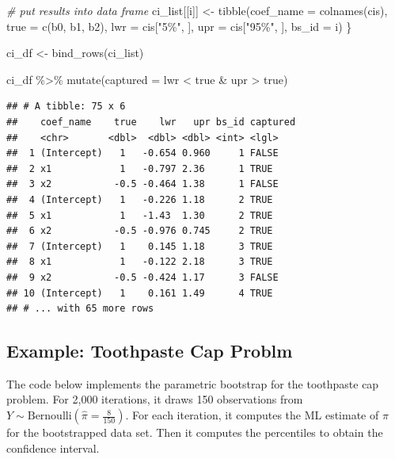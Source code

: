 \documentclass[
]{book}
\newenvironment{Shaded}{\begin{snugshade}}{\end{snugshade}}
\newcommand{\AttributeTok}[1]{\textcolor[rgb]{0.77,0.63,0.00}{#1}}
\newcommand{\CommentTok}[1]{\textcolor[rgb]{0.56,0.35,0.01}{\textit{#1}}}
\newcommand{\FunctionTok}[1]{\textcolor[rgb]{0.00,0.00,0.00}{#1}}
\newcommand{\NormalTok}[1]{#1}
\newcommand{\OtherTok}[1]{\textcolor[rgb]{0.56,0.35,0.01}{#1}}
\newcommand{\SpecialCharTok}[1]{\textcolor[rgb]{0.00,0.00,0.00}{#1}}
\newcommand{\StringTok}[1]{\textcolor[rgb]{0.31,0.60,0.02}{#1}}
\begin{document}
\begin{Shaded}
\begin{Highlighting}[]
  \CommentTok{\# put results into data frame}
\NormalTok{  ci\_list[[i]] }\OtherTok{\textless{}{-}} \FunctionTok{tibble}\NormalTok{(}\AttributeTok{coef\_name =} \FunctionTok{colnames}\NormalTok{(cis),}
                         \AttributeTok{true =} \FunctionTok{c}\NormalTok{(b0, b1, b2),}
                  \AttributeTok{lwr =}\NormalTok{ cis[}\StringTok{"5\%"}\NormalTok{, ],}
                  \AttributeTok{upr =}\NormalTok{ cis[}\StringTok{"95\%"}\NormalTok{, ], }
                  \AttributeTok{bs\_id =}\NormalTok{ i)}
\NormalTok{\}}

\NormalTok{ci\_df }\OtherTok{\textless{}{-}} \FunctionTok{bind\_rows}\NormalTok{(ci\_list)}

\NormalTok{ci\_df }\SpecialCharTok{\%\textgreater{}\%}
  \FunctionTok{mutate}\NormalTok{(}\AttributeTok{captured =}\NormalTok{ lwr }\SpecialCharTok{\textless{}}\NormalTok{ true }\SpecialCharTok{\&}\NormalTok{ upr }\SpecialCharTok{\textgreater{}}\NormalTok{ true)}
\end{Highlighting}
\end{Shaded}

\begin{verbatim}
## # A tibble: 75 x 6
##    coef_name    true    lwr   upr bs_id captured
##    <chr>       <dbl>  <dbl> <dbl> <int> <lgl>   
##  1 (Intercept)   1   -0.654 0.960     1 FALSE   
##  2 x1            1   -0.797 2.36      1 TRUE    
##  3 x2           -0.5 -0.464 1.38      1 FALSE   
##  4 (Intercept)   1   -0.226 1.18      2 TRUE    
##  5 x1            1   -1.43  1.30      2 TRUE    
##  6 x2           -0.5 -0.976 0.745     2 TRUE    
##  7 (Intercept)   1    0.145 1.18      3 TRUE    
##  8 x1            1   -0.122 2.18      3 TRUE    
##  9 x2           -0.5 -0.424 1.17      3 FALSE   
## 10 (Intercept)   1    0.161 1.49      4 TRUE    
## # ... with 65 more rows
\end{verbatim}

\hypertarget{example-toothpaste-cap-problm-1}{%
\subsection{Example: Toothpaste Cap
Problm}\label{example-toothpaste-cap-problm-1}}

The code below implements the parametric bootstrap for the toothpaste
cap problem. For 2,000 iterations, it draws 150 observations from
\(Y \sim \text{Bernoulli}(\hat{\pi} = \frac{8}{150})\). For each
iteration, it computes the ML estimate of \(\pi\) for the bootstrapped
data set. Then it computes the percentiles to obtain the confidence
interval.
\end{document}
